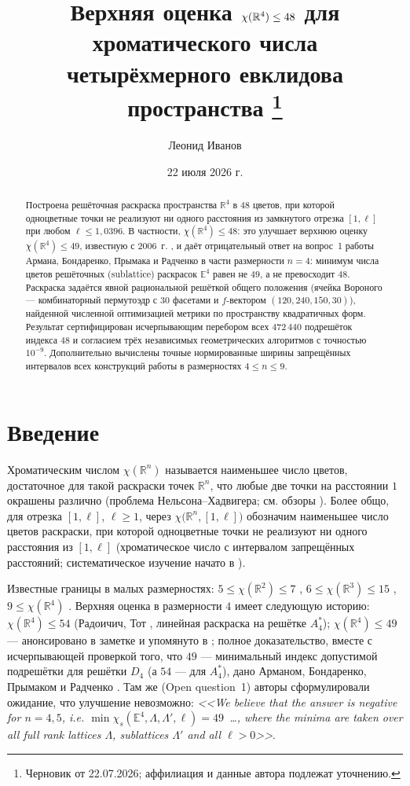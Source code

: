 \documentclass[12pt]{article}
\title{Верхняя оценка $\chi(\R^4)\le 48$ для хроматического числа
четырёхмерного евклидова пространства%
\thanks{Черновик от 22.07.2026; аффилиация и данные автора подлежат уточнению.}}
\author{Леонид Иванов}
\date{22 июля 2026 г.}
\theoremstyle{definition}
\theoremstyle{remark}
\newcommand{\R}{\mathbb{R}}
\newcommand{\E}{\mathbb{E}}
\begin{document}
\maketitle

\begin{abstract}
Построена решёточная раскраска пространства $\R^4$ в $48$ цветов, при которой
одноцветные точки не реализуют ни одного расстояния из замкнутого отрезка
$[1,\ell]$ при любом $\ell\le 1{,}0396$. В частности, $\chi(\R^4)\le 48$: это
улучшает верхнюю оценку $\chi(\R^4)\le 49$, известную с 2006~г.
\cite{Ivanov2006,CoulsonPayne2007,ABPR}, и даёт отрицательный ответ на вопрос~1
работы Армана, Бондаренко, Прымака и Радченко \cite{ABPR} в части размерности
$n=4$: минимум числа цветов решёточных (sublattice) раскрасок $\E^4$ равен не
$49$, а не превосходит $48$. Раскраска задаётся явной рациональной решёткой
общего положения (ячейка Вороного --- комбинаторный пермутоэдр с $30$ фасетами
и $f$-вектором $(120,240,150,30)$), найденной численной оптимизацией метрики
по пространству квадратичных форм.
Результат сертифицирован исчерпывающим перебором всех $472\,440$ подрешёток
индекса $48$ и согласием трёх независимых геометрических алгоритмов с точностью
$10^{-9}$. Дополнительно вычислены точные нормированные ширины запрещённых
интервалов всех конструкций работы \cite{ABPR} в размерностях $4\le n\le 9$.
\end{abstract}

\section{Введение}

Хроматическим числом $\chi(\R^n)$ называется наименьшее число цветов,
достаточное для такой раскраски точек $\R^n$, что любые две точки на расстоянии
$1$ окрашены различно (проблема Нельсона--Хадвигера; см. обзоры
\cite{Raigorodskii2000,Soifer}). Более общо, для отрезка $[1,\ell]$,
$\ell\ge 1$, через $\chi\bigl(\R^n,[1,\ell]\bigr)$ обозначим наименьшее число
цветов раскраски, при которой одноцветные точки не реализуют ни одного
расстояния из $[1,\ell]$ (хроматическое число с интервалом запрещённых
расстояний; систематическое изучение начато в \cite{Ivanov2011}).

Известные границы в малых размерностях:
$5\le\chi(\R^2)\le 7$ \cite{deGrey,Soifer},
$6\le\chi(\R^3)\le 15$ \cite{Nechushtan,Coulson},
$9\le\chi(\R^4)$ \cite{ExooIsmailescu}. Верхняя оценка в размерности $4$
имеет следующую историю: $\chi(\R^4)\le 54$ (Радоичич, Тот \cite{RadoicicToth},
линейная раскраска на решётке $A_4^*$); $\chi(\R^4)\le 49$ --- анонсировано в
заметке \cite{Ivanov2006} и упомянуто в \cite{CoulsonPayne2007}; полное
доказательство, вместе с исчерпывающей проверкой того, что $49$ ---
минимальный индекс допустимой подрешётки для решётки $D_4$ (а $54$ --- для
$A_4^*$), дано Арманом, Бондаренко, Прымаком и Радченко \cite{ABPR}. Там же
(Open question~1) авторы сформулировали ожидание, что улучшение невозможно:
\emph{<<We believe that the answer is negative for $n=4,5$, i.e.
$\min\chi_s(\E^4,\Lambda,\Lambda',\ell)=49$~\ldots, where the minima are taken
over all full rank lattices $\Lambda$, sublattices $\Lambda'$ and all
$\ell>0$>>}.
\end{document}
